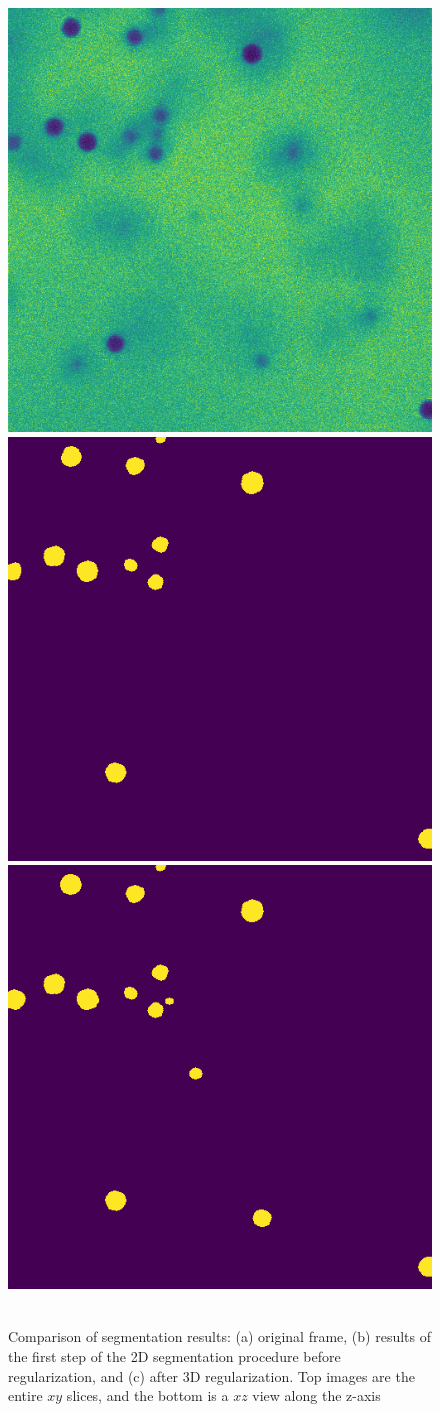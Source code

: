 \documentclass{llncs}
\begin{document}
\begin{figure}
\centering
\includegraphics[width = 0.3\linewidth]{images/orig_tot.png}
\includegraphics[width = 0.3\linewidth]{images/seg_base_tot.png}
\includegraphics[width = 0.3\linewidth]{images/modif_tot.png}\\
\vspace{0.3em}
\\
\caption{Comparison of segmentation results: (a) original frame, (b) results of the first step of the 2D segmentation procedure before regularization, and (c) after 3D regularization. Top images are the entire $xy$ slices, and the bottom is a $xz$ view along the z-axis}
\label{fig:compa}
\end{figure}
\end{document}
